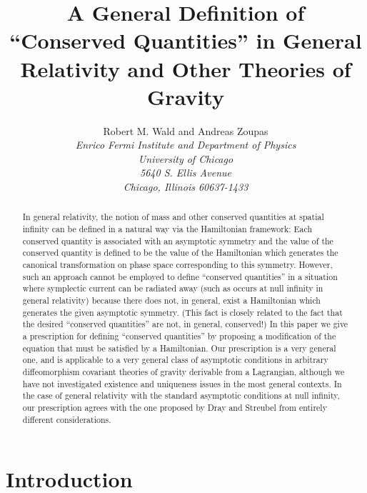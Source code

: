 


\title{A General Definition of ``Conserved Quantities'' in General 
Relativity and Other Theories of Gravity}
\author{Robert M. Wald and Andreas Zoupas\\
         {\it Enrico Fermi Institute and Department of Physics}\\
         {\it University of Chicago}\\
         {\it 5640 S. Ellis Avenue}\\
         {\it Chicago, Illinois 60637-1433}}
\maketitle

\begin{abstract}

In general relativity, the notion of mass and other conserved
quantities at spatial infinity can be defined in a natural way via the
Hamiltonian framework: Each conserved quantity is associated with an
asymptotic symmetry and the value of the conserved quantity is defined
to be the value of the Hamiltonian which generates the canonical
transformation on phase space corresponding to this symmetry. However,
such an approach cannot be employed to define ``conserved quantities''
in a situation where symplectic current can be radiated away (such as
occurs at null infinity in general relativity) because there does not,
in general, exist a Hamiltonian which generates the given asymptotic
symmetry. (This fact is closely related to the fact that the desired
``conserved quantities'' are not, in general, conserved!) In this
paper we give a prescription for defining ``conserved quantities''
by proposing a modification of the equation that must be
satisfied by a Hamiltonian. Our prescription is a very general one,
and is applicable to a very general class of asymptotic conditions in
arbitrary diffeomorphism covariant theories of gravity derivable from
a Lagrangian, although we have not investigated existence and
uniqueness issues in the most general contexts. In the case of general
relativity with the standard asymptotic conditions at null infinity,
our prescription agrees with the one proposed by Dray and Streubel
from entirely different considerations.

\end{abstract}
\newpage

\section{Introduction}

